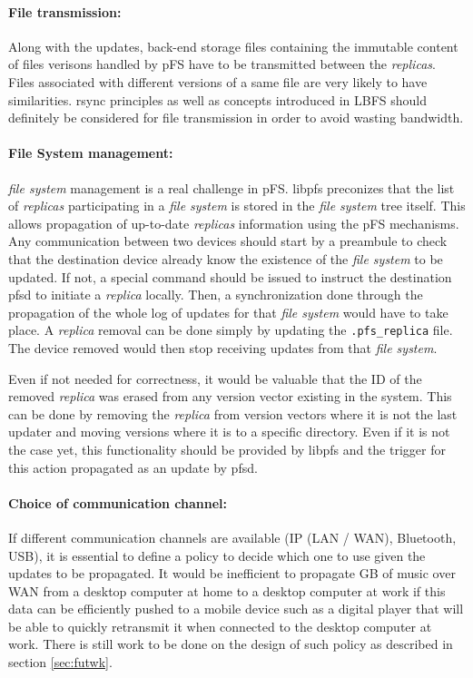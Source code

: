 \paragraph {File transmission:}
Along with the updates, back-end storage files containing the
immutable content of files verisons handled by pFS have to be
transmitted between the \emph{replicas}. Files associated with
different versions of a same file are very likely to have
similarities. rsync\cite{tridgell:rsync} principles as well as concepts
introduced in LBFS\cite{muthitacharoen:lbfs} should definitely be
considered for file transmission in order to avoid wasting bandwidth.

\paragraph {File System management:}
\emph{file system} management is a real challenge in pFS. libpfs
preconizes that the list of \emph{replicas} participating in a
\emph{file system} is stored in the \emph{file system} tree
itself. This allows propagation of up-to-date \emph{replicas} information
using the pFS mechanisms. Any communication between two
devices should start by a preambule to check that the
destination device already know the existence of the
\emph{file system} to be updated. If not, a special command should be
issued to instruct the destination pfsd to initiate a \emph{replica}
locally. Then, a synchronization done through the propagation
of the whole log of updates for that \emph{file system} would have to
take place. A \emph{replica} removal can be done simply by updating
the {\tt .pfs\_replica} file. The device removed would then
stop receiving updates from that \emph{file system}.

Even if not needed for correctness, it would be valuable that the ID
of the removed \emph{replica} was erased from any version vector
existing in the system. This can be done by removing the
\emph{replica} from version vectors where it is not the last updater
and moving versions where it is to a specific directory. Even if it is
not the case yet, this functionality should be provided by libpfs and
the trigger for this action propagated as an update by pfsd.

\paragraph {Choice of communication channel:}
If different communication channels are available (IP (LAN / WAN),
Bluetooth, USB), it is essential to define a policy to decide which
one to use given the updates to be propagated. It would be inefficient
to propagate GB of music over WAN from a desktop computer at home to a
desktop computer at work if this data can be efficiently pushed to a
mobile device such as a digital player that will be able to quickly
retransmit it when connected to the desktop computer at work. There is
still work to be done on the design of such policy as described in
section \ref{sec:futwk}.


